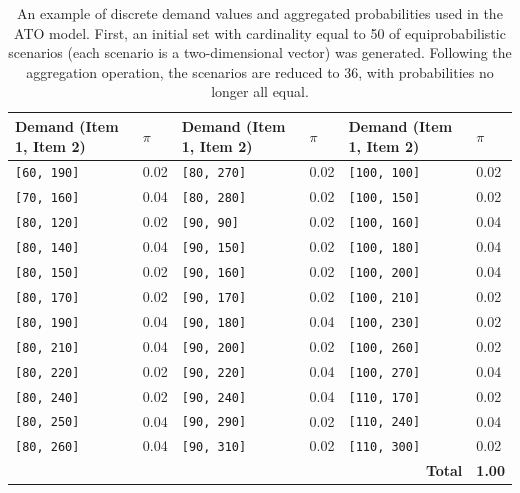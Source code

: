 \documentclass[a4paper,12pt]{article}
\begin{document}
			
	\begin{table}[H]
		\centering
		\footnotesize
		\label{tab:ato-general-results}
		\renewcommand{\arraystretch}{1.1}
		\begin{tabular}{|@{\hskip 2pt}p{3.2cm}@{\hskip 2pt}|@{\hskip 2pt}p{1cm}@{\hskip 2pt}||@{\hskip 2pt}p{3.2cm}@{\hskip 2pt}|@{\hskip 2pt}p{1cm}@{\hskip 2pt}||@{\hskip 2pt}p{3.2cm}@{\hskip 2pt}|@{\hskip 2pt}p{1cm}@{\hskip 2pt}|}
			\hline
			\textbf{Demand (Item 1, Item 2)} & \textbf{$\pi$} &
			\textbf{Demand (Item 1, Item 2)} & \textbf{$\pi$} &
			\textbf{Demand (Item 1, Item 2)} & \textbf{$\pi$} \\
			\hline
			\texttt{[60, 190]}  & 0.02 & \texttt{[80, 270]} & 0.02 & \texttt{[100, 100]} & 0.02 \\
			\texttt{[70, 160]}  & 0.04 & \texttt{[80, 280]} & 0.02 & \texttt{[100, 150]} & 0.02 \\
			\texttt{[80, 120]}  & 0.02 & \texttt{[90, 90]}   & 0.02 & \texttt{[100, 160]} & 0.04 \\
			\texttt{[80, 140]}  & 0.04 & \texttt{[90, 150]}  & 0.02 & \texttt{[100, 180]} & 0.04 \\
			\texttt{[80, 150]}  & 0.02 & \texttt{[90, 160]}  & 0.02 & \texttt{[100, 200]} & 0.04 \\
			\texttt{[80, 170]}  & 0.02 & \texttt{[90, 170]}  & 0.02 & \texttt{[100, 210]} & 0.02 \\
			\texttt{[80, 190]}  & 0.04 & \texttt{[90, 180]}  & 0.04 & \texttt{[100, 230]} & 0.02 \\
			\texttt{[80, 210]}  & 0.04 & \texttt{[90, 200]}  & 0.02 & \texttt{[100, 260]} & 0.02 \\
			\texttt{[80, 220]}  & 0.02 & \texttt{[90, 220]}  & 0.04 & \texttt{[100, 270]} & 0.04 \\
			\texttt{[80, 240]}  & 0.02 & \texttt{[90, 240]}  & 0.04 & \texttt{[110, 170]} & 0.02 \\
			\texttt{[80, 250]}  & 0.04 & \texttt{[90, 290]}  & 0.02 & \texttt{[110, 240]} & 0.04 \\
			\texttt{[80, 260]}  & 0.04 & \texttt{[90, 310]}  & 0.02 & \texttt{[110, 300]} & 0.02 \\
			\hline
			\multicolumn{5}{|r|}{\textbf{Total}} & \textbf{1.00} \\
			\hline
		\end{tabular}
		\caption{An example of discrete demand values and aggregated probabilities used in the ATO model. First, an initial set with cardinality equal to 50 of equiprobabilistic scenarios (each scenario is a two-dimensional vector) was generated. Following the aggregation operation, the scenarios are reduced to 36, with probabilities no longer all equal.}
	\end{table}
	
\end{document}
